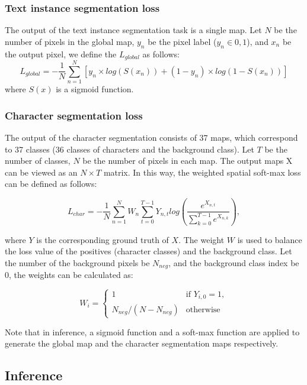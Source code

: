 \documentclass[runningheads]{llncs}
\begin{document}
\subsubsection{Text instance segmentation loss}
The output of the text instance segmentation task is a single map. Let $N$ be the number of pixels in the global map, $y_n$ be the pixel label ($y_n \in {0,1}$), and $x_n$ be the output pixel, we define the $L_{global}$ as follows:
\begin{equation}
L_{global} = -\frac{1}{N}\sum_{n=1}^{N}\left [ y_n \times log(S(x_n)) + (1-y_n) \times log(1- S(x_n)) \right ]
\end{equation}
where $S(x)$ is a sigmoid function.

\subsubsection{Character segmentation loss}
The output of the character segmentation consists of 37 maps, which correspond to 37 classes (36 classes of characters and the background class). Let $T$ be the number of classes, $N$ be the number of pixels in each map. The output maps X can be viewed as an $N \times T$ matrix. In this way, the weighted spatial soft-max loss can be defined as follows:

\begin{equation}
L_{char} = -\frac{1}{N}\sum_{n=1}^{N}W_n\sum_{t=0}^{T-1} Y_{n,t} log(\frac{e^{X_{n,t}}}{\sum_{k=0}^{T-1} e^{X_{n,k}}}),
\end{equation}

where $Y$ is the corresponding ground truth of $X$. The weight $W$ is used to balance the loss value of the positives (character classes) and the background class. Let the number of the background pixels be $N_{neg}$, and the background class index be $0$, the weights can be calculated as:

\begin{equation}
  W_i = 
  \begin{cases}
    1& \text{if } Y_{i,0}=1, \\
    N_{neg} / (N - N_{neg})& \text{otherwise}
  \end{cases}
\end{equation}


Note that in inference, a sigmoid function and a soft-max function are applied to generate the global map and the character segmentation maps respectively.


\subsection{Inference}
\end{document}
